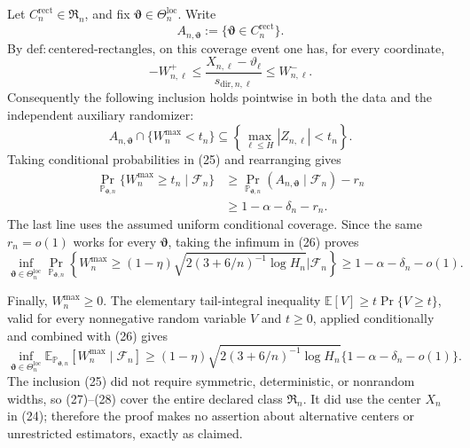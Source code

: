 Let \(C_n^{\mathrm{rect}}\in\mathfrak R_n\), and fix
\(\boldsymbol\vartheta\in\Theta_n^{\mathrm{loc}}\).  Write
\[
 A_{n,\boldsymbol\vartheta}
 :=\{\boldsymbol\vartheta\in C_n^{\mathrm{rect}}\}.
\]
By \(\mathrm{def{:}centered\mbox{-}rectangles}\), on this coverage event one
has, for every coordinate,
\[
 -W^+_{n,\ell}
 \leq \frac{X_{n,\ell}-\vartheta_\ell}{s_{\mathrm{dir},n,\ell}}
 \leq W^-_{n,\ell}.                                        \tag{24}
\]
Consequently the following inclusion holds pointwise in both the data and the
independent auxiliary randomizer:
\[
 A_{n,\boldsymbol\vartheta}\cap\{W_n^{\max}<t_n\}
 \subseteq\left\{\max_{\ell\leq H}|Z_{n,\ell}|<t_n\right\}. \tag{25}
\]
Taking conditional probabilities in (25) and rearranging gives
\[
\begin{aligned}
 \Pr_{\mathbb P_{\boldsymbol\vartheta,n}}
   \{W_n^{\max}\geq t_n\mid\mathcal F_n\}
 &\geq
 \Pr_{\mathbb P_{\boldsymbol\vartheta,n}}
   (A_{n,\boldsymbol\vartheta}\mid\mathcal F_n)-r_n\\
 &\geq1-\alpha-\delta_n-r_n.                               \tag{26}
\end{aligned}
\]
The last line uses the assumed uniform conditional coverage.  Since the same
\(r_n=o(1)\) works for every \(\boldsymbol\vartheta\), taking the infimum in
(26) proves
\[
 \inf_{\boldsymbol\vartheta\in\Theta_n^{\mathrm{loc}}}
 \Pr_{\mathbb P_{\boldsymbol\vartheta,n}}
 \left\{W_n^{\max}\geq
 (1-\eta)\sqrt{2(3+6/n)^{-1}\log H_n}
 \mathrel{\big|}\mathcal F_n\right\}
 \geq1-\alpha-\delta_n-o(1).                               \tag{27}
\]

Finally, \(W_n^{\max}\geq0\).  The elementary tail-integral inequality
\(\mathbb E[V]\geq t\Pr\{V\geq t\}\), valid for every nonnegative random
variable \(V\) and \(t\geq0\), applied conditionally and combined with (26)
gives
\[
 \inf_{\boldsymbol\vartheta\in\Theta_n^{\mathrm{loc}}}
 \mathbb E_{\mathbb P_{\boldsymbol\vartheta,n}}
 [W_n^{\max}\mid\mathcal F_n]
 \geq(1-\eta)\sqrt{2(3+6/n)^{-1}\log H_n}
       \{1-\alpha-\delta_n-o(1)\}.                          \tag{28}
\]
The inclusion (25) did not require symmetric, deterministic, or nonrandom
widths, so (27)--(28) cover the entire declared class \(\mathfrak R_n\).  It
did use the center \(X_n\) in (24); therefore the proof makes no assertion
about alternative centers or unrestricted estimators, exactly as claimed.
